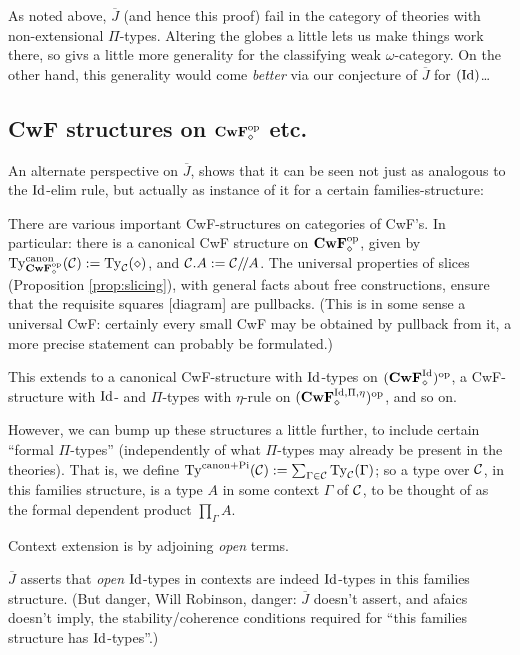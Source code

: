 \documentclass{amsart}
\newcommand{\Jbar}{\overline{J}}
\begin{document}
As noted above, $\Jbar$ (and hence this proof) fail in the category of theories with non-extensional $\Pi$-types.  Altering the globes a little lets us make things work there, so givs a little more generality for the classifying weak $\omega$-category.  On the other hand, this generality would come \emph{better} via our conjecture of $\Jbar$ for $(\mathrm{Id})$\ldots

\subsection{CwF structures on $\mathbf{CwF}_\diamond^{\mathrm{op}}$ etc.}

An alternate perspective on $\Jbar$, shows that it can be seen not just as analogous to the $\mathrm{Id}$-elim rule, but actually as instance of it for a certain families-structure:

There are various important CwF-structures on categories of CwF's. In particular: there is a canonical CwF structure on $\mathbf{CwF}_\diamond^{\mathrm{op}}$, given by $\mathrm{Ty}^\mathrm{canon}_{\mathbf{CwF}_\diamond^{\mathrm{op}}}(\mathcal{C}) := \mathrm{Ty}_{\mathcal{C}}(\diamond)$, and $\mathcal{C}.A := \mathcal{C}/\!/A$.  The universal properties of slices (Proposition \ref{prop:slicing}), with general facts about free constructions, ensure that the requisite squares [diagram] are pullbacks.  (This is in some sense a universal CwF: certainly every small CwF may be obtained by pullback from it, a more precise statement can probably be formulated.)

This extends to a canonical CwF-structure with $\mathrm{Id}$-types on $(\mathbf{CwF}^{\mathrm{Id}}_\diamond)^{\mathrm{op}}$, a CwF-structure with $\mathrm{Id}$- and $\Pi$-types with $\eta$-rule on $(\mathbf{CwF}^{\mathrm{Id},\Pi,\eta}_\diamond)^{\mathrm{op}}$, and so on.

However, we can bump up these structures a little further, to include certain ``formal $\Pi$-types'' (independently of what $\Pi$-types may already be present in the theories).  That is, we define $\mathrm{Ty}^\mathrm{canon + Pi}(\mathcal{C}) := \sum_{\Gamma \in \mathcal{C}} \mathrm{Ty}_{\mathcal{C}}(\Gamma)$; so a type over $\mathcal{C}$, in this families structure, is a type $A$ in some context $\Gamma$ of $\mathcal{C}$, to be thought of as the formal dependent product $\prod_\Gamma A$.

Context extension is by adjoining \emph{open} terms.

$\Jbar$ asserts that \emph{open} $\mathrm{Id}$-types in contexts are indeed $\mathrm{Id}$-types in this families structure.  (But danger, Will Robinson, danger: $\Jbar$ doesn't assert, and afaics doesn't imply, the stability/coherence conditions required for ``this families structure has $\mathrm{Id}$-types''.)


\clearpage













































\end{document}
